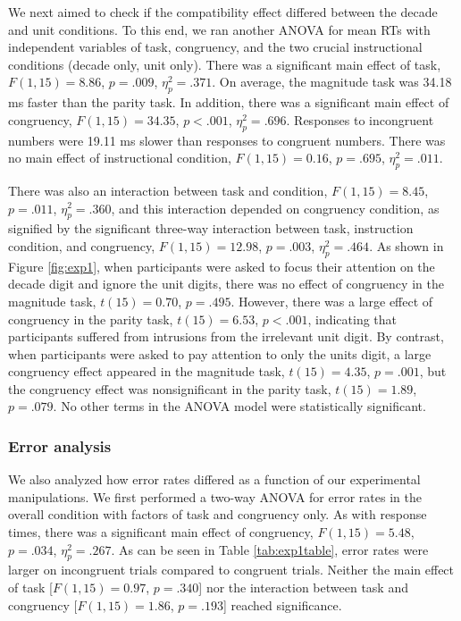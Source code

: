 \documentclass[english,man]{apa6}
\theoremstyle{definition}
\theoremstyle{definition}
\theoremstyle{definition}
\theoremstyle{remark}
\begin{document}
We next aimed to check if the compatibility effect differed between the
decade and unit conditions. To this end, we ran another ANOVA for mean
RTs with independent variables of task, congruency, and the two crucial
instructional conditions (decade only, unit only). There was a
significant main effect of task, \(F(1, 15) = 8.86\), \(p = .009\),
\(\eta^2_p = .371\). On average, the magnitude task was 34.18 ms faster
than the parity task. In addition, there was a significant main effect
of congruency, \(F(1, 15) = 34.35\), \(p < .001\), \(\eta^2_p = .696\).
Responses to incongruent numbers were 19.11 ms slower than responses to
congruent numbers. There was no main effect of instructional condition,
\(F(1, 15) = 0.16\), \(p = .695\), \(\eta^2_p = .011\).

There was also an interaction between task and condition,
\(F(1, 15) = 8.45\), \(p = .011\), \(\eta^2_p = .360\), and this
interaction depended on congruency condition, as signified by the
significant three-way interaction between task, instruction condition,
and congruency, \(F(1, 15) = 12.98\), \(p = .003\), \(\eta^2_p = .464\).
As shown in Figure \ref{fig:exp1}, when participants were asked to focus
their attention on the decade digit and ignore the unit digits, there
was no effect of congruency in the magnitude task, \(t(15) = 0.70\),
\(p = .495\). However, there was a large effect of congruency in the
parity task, \(t(15) = 6.53\), \(p < .001\), indicating that
participants suffered from intrusions from the irrelevant unit digit. By
contrast, when participants were asked to pay attention to only the
units digit, a large congruency effect appeared in the magnitude task,
\(t(15) = 4.35\), \(p = .001\), but the congruency effect was
nonsignificant in the parity task, \(t(15) = 1.89\), \(p = .079\). No
other terms in the ANOVA model were statistically significant.

\subsubsection{Error analysis}\label{error-analysis}

We also analyzed how error rates differed as a function of our
experimental manipulations. We first performed a two-way ANOVA for error
rates in the overall condition with factors of task and congruency only.
As with response times, there was a significant main effect of
congruency, \(F(1, 15) = 5.48\), \(p = .034\), \(\eta^2_p = .267\). As
can be seen in Table \ref{tab:exp1table}, error rates were larger on
incongruent trials compared to congruent trials. Neither the main effect
of task {[}\(F(1, 15) = 0.97\), \(p = .340\){]} nor the interaction
between task and congruency {[}\(F(1, 15) = 1.86\), \(p = .193\){]}
reached significance.
\end{document}
